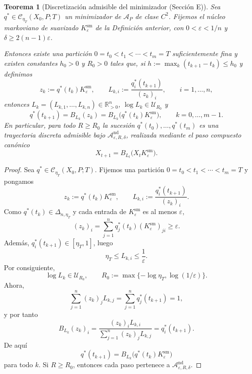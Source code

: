 ﻿\documentclass[12pt]{article}
\newcommand{\fuente}[1]{\textnormal{(#1)}}
\newtheorem{teorema}{Teorema}[section]
\begin{document}
\begin{teorema}[Discretización admisible del minimizador \fuente{Sección E}]
Sea \(q^*\in \mathcal C_{\eta_T}(X_0,P;T)\) un minimizador de \(\mathcal A_P\) de clase \(C^2\). Fijemos el núcleo markoviano de suavizado \(K_\varepsilon^{\mathrm{sm}}\) de la Definición anterior, con \(0<\varepsilon<1/n\) y \(\delta\ge 2(n-1)\varepsilon\).

Entonces existe una partición \(0=t_0<t_1<\cdots<t_m=T\) suficientemente fina y existen constantes \(h_0>0\) y \(R_0>0\) tales que, si \(h:=\max_k(t_{k+1}-t_k)\le h_0\) y definimos
\[
z_k:=q^*(t_k)K_\varepsilon^{\mathrm{sm}},\qquad
L_{k,i}:=\frac{q_i^*(t_{k+1})}{(z_k)_i},\qquad i=1,\dots,n,
\]
entonces \(L_k=(L_{k,1},\dots,L_{k,n})\in\mathbb R_{>0}^n\), \(\log L_k\in\mathcal U_{R_0}\) y
\[
q^*(t_{k+1})=B_{L_k}(z_k)=B_{L_k}\bigl(q^*(t_k)K_\varepsilon^{\mathrm{sm}}\bigr),\qquad k=0,\dots,m-1.
\]
En particular, para todo \(R\ge R_0\) la sucesión \(q^*(t_0),\dots,q^*(t_m)\) es una trayectoria discreta admisible bajo \(\mathcal A_{\varepsilon,R,\delta}^{\mathrm{nd}}\), realizada mediante el paso compuesto canónico
\[
X_{t+1}=B_{L_t}\bigl(X_tK_\varepsilon^{\mathrm{sm}}\bigr).
\]
\end{teorema}
\begin{proof}
Sea \(q^*\in\mathcal C_{\eta_T}(X_0,P;T)\). Fijemos una partición \(0=t_0<t_1<\cdots<t_m=T\) y pongamos
\[
z_k:=q^*(t_k)K_\varepsilon^{\mathrm{sm}},
\qquad
L_{k,i}:=\frac{q_i^*(t_{k+1})}{(z_k)_i}.
\]
Como \(q^*(t_k)\in\Delta_{n,\eta_T}\) y cada entrada de \(K_\varepsilon^{\mathrm{sm}}\) es al menos \(\varepsilon\),
\[
(z_k)_i=\sum_{j=1}^n q_j^*(t_k)(K_\varepsilon^{\mathrm{sm}})_{ji}\ge \varepsilon.
\]
Además, \(q_i^*(t_{k+1})\in[\eta_T,1]\), luego
\[
\eta_T\le L_{k,i}\le \frac1\varepsilon.
\]
Por consiguiente,
\[
\log L_k\in\mathcal U_{R_0},
\qquad
R_0:=\max\{-\log\eta_T,\log(1/\varepsilon)\}.
\]
Ahora,
\[
\sum_{j=1}^n (z_k)_jL_{k,j}
=\sum_{j=1}^n q_j^*(t_{k+1})=1,
\]
y por tanto
\[
B_{L_k}(z_k)_i
=\frac{(z_k)_iL_{k,i}}{\sum_{j=1}^n (z_k)_jL_{k,j}}
=q_i^*(t_{k+1}).
\]
De aquí
\[
q^*(t_{k+1})=B_{L_k}\bigl(q^*(t_k)K_\varepsilon^{\mathrm{sm}}\bigr)
\]
para todo \(k\). Si \(R\ge R_0\), entonces cada paso pertenece a \(\mathcal A_{\varepsilon,R,\delta}^{\mathrm{nd}}\).
\end{proof}
\end{document}
